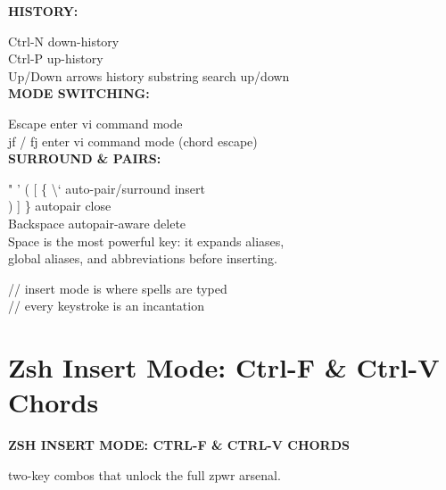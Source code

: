 \documentclass[11pt,a4paper,twoside]{book}
\begin{document}
\vspace{12pt}
{\bfseries\color{neonyellow} HISTORY:}\vspace{4pt}

Ctrl-N                down-history\\
Ctrl-P                up-history\\
Up/Down arrows        history substring search up/down\\


\vspace{12pt}
{\bfseries\color{neonyellow} MODE SWITCHING:}\vspace{4pt}

Escape                enter vi command mode\\
jf / fj              enter vi command mode (chord escape)\\


\vspace{12pt}
{\bfseries\color{neonyellow} SURROUND \& PAIRS:}\vspace{4pt}

" ' ( [ \{ \textbackslash{}`          auto-pair/surround insert\\
) ] \}                 autopair close\\
Backspace             autopair-aware delete\\

Space is the most powerful key: it expands aliases,\\
global aliases, and abbreviations before inserting.\\

\begin{codebox}
\color{neongreen}// insert mode is where spells are typed\\
\color{neongreen}// every keystroke is an incantation\\
\end{codebox}


\vspace{16pt}

\section{Zsh Insert Mode: Ctrl-F \& Ctrl-V Chords}


\vspace{10pt}
{\large\bfseries\color{neoncyan} ZSH INSERT MODE: CTRL-F \& CTRL-V CHORDS}\vspace{6pt}

two-key combos that unlock the full zpwr arsenal.\\
\end{document}
